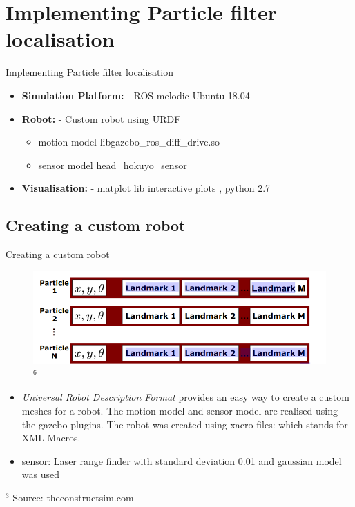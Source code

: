 \documentclass{beamer}
\begin{document}
\section{Implementing Particle filter localisation}
\begin{frame}{Implementing Particle filter localisation}
    \begin{itemize}
        \item \textbf{Simulation Platform: } - ROS melodic Ubuntu 18.04 
        \item \textbf{Robot: } - Custom robot using URDF
        \begin{itemize}
            \item motion model libgazebo\_ros\_diff\_drive.so 
            \item sensor model head\_hokuyo\_sensor
        \end{itemize}
        \item \textbf{Visualisation: } - matplot lib interactive plots , python 2.7
    \end{itemize}
\end{frame}

\subsection{Creating a custom robot}
\begin{frame}{Creating a custom robot}
    \begin{figure}
        \centering
        \includegraphics[width=\textwidth]{RBPF_particles.png}$^{6}$
    \end{figure}
    \begin{itemize}
    \item \textit{Universal Robot Description Format} provides an easy way to create a custom meshes for a robot. The motion model and sensor model are realised using the gazebo plugins. The robot was created using xacro files: which stands for XML Macros. 
    \item sensor: Laser range finder with standard deviation 0.01 and gaussian model was used
    \end{itemize}
    \vfill
    \tiny{$^{3}$} Source: theconstructsim.com
\end{frame}
\end{document}

